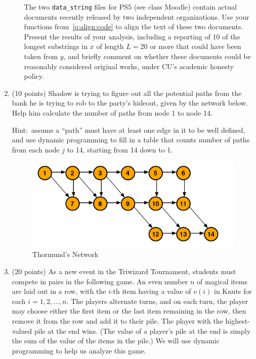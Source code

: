 \documentclass[12pt]{article}
\begin{document}
\begin{enumerate}
\begin{enumerate}
	The two {\tt data\_string} files for PS5 (see class Moodle) contain actual documents recently released by two independent organizations. Use your functions from~\eqref{q:align:code} to align the text of these two documents. Present the results of your analysis, including a reporting of 10 of the longest substrings in $x$ of length $L=20$ or more that could have been taken from $y$, and briefly comment on whether these documents could be reasonably considered original works, under CU's academic honesty policy.
		
	\end{enumerate}
	
	\pagebreak
    
	\item (10 points) Shadow is trying to figure out all the potential paths from the bank he is trying to rob to the party's hideout, given by the network below.  Help him calculate the number of paths from node 1 to node 14.
	
	Hint:\ assume a ``path'' must have at least one edge in it to be well defined, and use dynamic programming to fill in a table that counts number of paths from each node $j$ to 14, starting from 14 down to 1.

    \begin{figure}[h!]
        \centering
        \includegraphics[scale=0.4]{graph.png}
        \caption{Thormund's Network}
        \label{fig:my_label}
    \end{figure}
    
    \pagebreak
    
	\item (20 points) As a new event in the Triwizard Tournament, students must compete in pairs in the following game. An even number $n$ of magical items are laid out in a row, with the $i$-th item having a value of $v(i)$ in Knuts for each $i=1,2,\dotsc,n$. The players alternate turns, and on each turn, the player may choose either the first item or the last item remaining in the row, then remove it from the row and add it to their pile. The player with the highest-valued pile at the end wins. (The value of a player's pile at the end is simply the sum of the value of the items in the pile.) We will use dynamic programming to help us analyze this game.
	

\end{enumerate}
\end{document}
